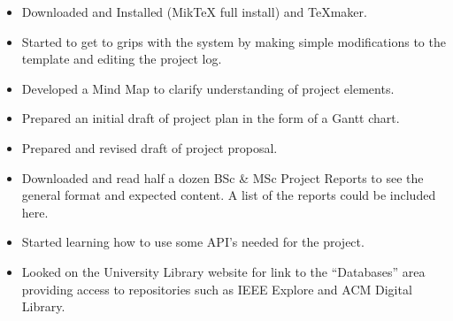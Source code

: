 \begin{itemize}
  \item Downloaded and Installed \latex (MikTeX full install) and TeXmaker. 
  \item Started to get to grips with the \latex system by making simple modifications to the template and editing the project log.
  \item Developed a Mind Map to clarify understanding of project elements.
  \item Prepared an initial draft of project plan in the form of a Gantt chart. 
  \item Prepared and revised draft of project proposal. 
  \item Downloaded and read half a dozen BSc \& MSc Project Reports to see the general format and expected content. A list of the reports could be included here.
  \item Started learning how to use some API's needed for the project. 
  \item Looked on the University Library website for link to the ``Databases'' area providing access to repositories such as IEEE Explore and ACM Digital Library. 
\end{itemize}



